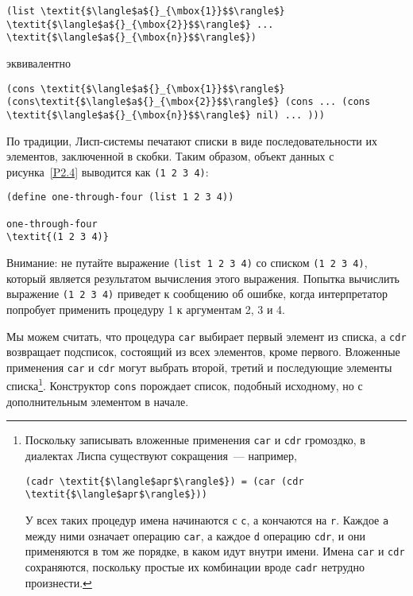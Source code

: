 \begin{Verbatim}[fontsize=\small]
(list \textit{$\langle$a${}_{\mbox{1}}$$\rangle$} \textit{$\langle$a${}_{\mbox{2}}$$\rangle$} ... \textit{$\langle$a${}_{\mbox{n}}$$\rangle$})
\end{Verbatim}
эквивалентно

\begin{Verbatim}[fontsize=\small]
(cons \textit{$\langle$a${}_{\mbox{1}}$$\rangle$} (cons\textit{$\langle$a${}_{\mbox{2}}$$\rangle$} (cons ... (cons \textit{$\langle$a${}_{\mbox{n}}$$\rangle$} nil) ... )))
\end{Verbatim}
По традиции, Лисп-системы  печатают списки в виде последовательности их 
элементов, заключенной в скобки.  Таким образом, объект данных с
рисунка~\ref{P2.4} выводится как {\tt (1 2 3
4)}:

\begin{Verbatim}[fontsize=\small]
(define one-through-four (list 1 2 3 4))

one-through-four
\textit{(1 2 3 4)}
\end{Verbatim}
Внимание: не путайте выражение {\tt (list 1 2 3 4)} со
списком {\tt (1 2 3 4)}, который является результатом
вычисления этого выражения.  Попытка вычислить
выражение {\tt (1 2 3 4)} приведет к сообщению об ошибке, когда 
интерпретатор попробует применить процедуру 1 к аргументам 2, 3 и
4.

Мы можем считать, что процедура {\tt car} выбирает
первый элемент из списка, а {\tt cdr} возвращает подсписок,
состоящий из всех элементов, кроме первого. Вложенные применения
{\tt car} и {\tt cdr} могут выбрать второй, третий и
последующие элементы списка\footnote{Поскольку записывать
вложенные применения 
{\tt car} и {\tt cdr} громоздко, в диалектах Лиспа
существуют сокращения~--- например,

\begin{Verbatim}[fontsize=\footnotesize]
(cadr \textit{$\langle$арг$\rangle$}) = (car (cdr \textit{$\langle$арг$\rangle$}))
\end{Verbatim}
У всех таких процедур имена начинаются с {\tt c}, а кончаются
на {\tt r}.  
Каждое {\tt a} между ними означает операцию 
{\tt car}, а каждое {\tt d} операцию {\tt cdr}, и 
они применяются в том же порядке, в каком идут внутри имени.  Имена
{\tt car} и {\tt cdr} сохраняются, поскольку простые их
комбинации вроде {\tt cadr} 
нетрудно произнести.}.
Конструктор {\tt cons} порождает список, подобный исходному, но с
дополнительным элементом в начале.

